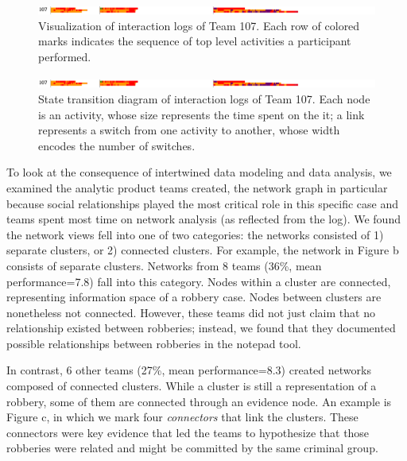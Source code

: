 \documentclass[]{article}
\begin{document}
\begin{figure}
\centering
\includegraphics{./Log_analysis/action_sequence_vis/G107.png}
\caption{Visualization of interaction logs of Team 107. Each row of
colored marks indicates the sequence of top level activities a
participant performed.}\label{fig:sequence}
\end{figure}

\begin{figure}
\centering
\includegraphics{./Log_analysis/action_sequence_vis/G107.png}
\caption{State transition diagram of interaction logs of Team 107. Each
node is an activity, whose size represents the time spent on the it; a
link represents a switch from one activity to another, whose width
encodes the number of switches.}\label{fig:sequence}
\end{figure}

To look at the consequence of intertwined data modeling and data
analysis, we examined the analytic product teams created, the network
graph in particular because social relationships played the most
critical role in this specific case and teams spent most time on network
analysis (as reflected from the log). We found the network views fell
into one of two categories: the networks consisted of 1) separate
clusters, or 2) connected clusters. For example, the network in Figure
\autocite{fig:network}b consists of separate clusters. Networks from 8
teams (36\%, mean performance=7.8) fall into this category. Nodes within
a cluster are connected, representing information space of a robbery
case. Nodes between clusters are nonetheless not connected. However,
these teams did not just claim that no relationship existed between
robberies; instead, we found that they documented possible relationships
between robberies in the notepad tool.

In contrast, 6 other teams (27\%, mean performance=8.3) created networks
composed of connected clusters. While a cluster is still a
representation of a robbery, some of them are connected through an
evidence node. An example is Figure \autocite{fig:network}c, in which we
mark four \emph{connectors} that link the clusters. These connectors
were key evidence that led the teams to hypothesize that those robberies
were related and might be committed by the same criminal group.
\end{document}

